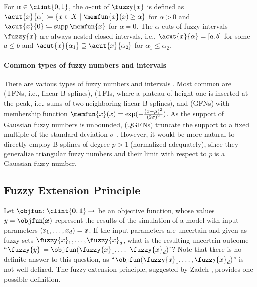 For $\alpha \in \clint{0, 1}$, the $\alpha$-cut of $\fuzzy{x}$ is
defined as $\acut{x}{\alpha} \ceq \{x \in X \mid \memfun{x}(x) \ge \alpha\}$
for $\alpha > 0$ and $\acut{x}{0} \ceq \supp \memfun{x}$ for $\alpha = 0$.
The $\alpha$-cuts of fuzzy intervals $\fuzzy{x}$ are always
nested closed intervals, i.e.,
$\acut{x}{\alpha} = [a, b]$ for some $a \le b$ and
$\acut{x}{\alpha_1} \supset \acut{x}{\alpha_2}$ for $\alpha_1 \le \alpha_2$.

\paragraph{Common types of fuzzy numbers and intervals}

There are various types of fuzzy numbers and intervals
\cite{Klimke06Uncertainty}.
Most common are
 (TFNs, i.e., linear B-splines),
(TFIs, where a plateau of height one is inserted at the peak, i.e.,
sums of two neighboring linear B-splines), and
 (GFNs) with membership function
$\memfun{x}(x) = \exp(-\frac{(x - \mu)^2}{(2\sigma)^2})$.
As the support of Gaussian fuzzy numbers is unbounded,
 (QGFNs) truncate the support
to a fixed multiple of the standard deviation $\sigma$
\cite{Klimke06Uncertainty}.
However, it would be more natural to directly employ B-splines of
degree $p > 1$ (normalized adequately), since they generalize
triangular fuzzy numbers and their limit with respect to $p$
is a Gaussian fuzzy number.



\subsection{Fuzzy Extension Principle}
\label{sec:552fuzzyExtensionPrinciple}

Let $\objfun\colon \clint{\*0, \*1} \to \real$ be an objective function,
whose values $y = \objfun(\*x)$ represent the results of the
simulation of a model with input parameters $(x_1, \dotsc, x_d) = {\boldsymbol{x}}$.
If the input parameters are uncertain and
given as fuzzy sets $\fuzzy{x}_1, \dotsc, \fuzzy{x}_d$,
what is the resulting uncertain outcome
``$\fuzzy{y} \ceq \objfun(\fuzzy{x}_1, \dotsc, \fuzzy{x}_d)$''?
Note that there is no definite answer to this question,
as ``$\objfun(\fuzzy{x}_1, \dotsc, \fuzzy{x}_d)$'' is not well-defined.
The fuzzy extension principle, suggested by Zadeh \cite{Zadeh75Concept},
provides one possible definition.

